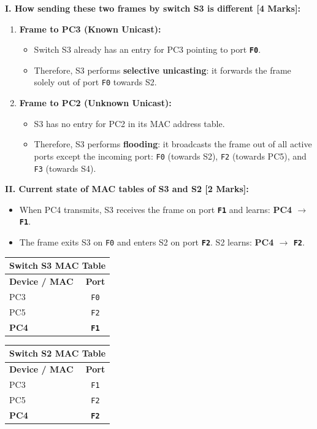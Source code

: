 \documentclass[11pt,a4paper]{article}
\begin{document}
\textbf{I. How sending these two frames by switch S3 is different [4 Marks]:}
\begin{enumerate}
    \item \textbf{Frame to PC3 (Known Unicast):}
    \begin{itemize}
        \item Switch S3 already has an entry for PC3 pointing to port \textbf{\texttt{F0}}.
        \item Therefore, S3 performs \textbf{selective unicasting}: it forwards the frame solely out of port \texttt{F0} towards S2.
    \end{itemize}
    \item \textbf{Frame to PC2 (Unknown Unicast):}
    \begin{itemize}
        \item S3 has no entry for PC2 in its MAC address table.
        \item Therefore, S3 performs \textbf{flooding}: it broadcasts the frame out of all active ports except the incoming port: \texttt{F0} (towards S2), \texttt{F2} (towards PC5), and \texttt{F3} (towards S4).
    \end{itemize}
\end{enumerate}

\vspace{0.2cm}
\textbf{II. Current state of MAC tables of S3 and S2 [2 Marks]:}
\begin{itemize}
    \item When PC4 transmits, S3 receives the frame on port \textbf{\texttt{F1}} and learns: \textbf{PC4 $\to$ \texttt{F1}}.
    \item The frame exits S3 on \texttt{F0} and enters S2 on port \textbf{\texttt{F2}}. S2 learns: \textbf{PC4 $\to$ \texttt{F2}}.
\end{itemize}

\begin{center}
\begin{tabular}{|l|c|}
\multicolumn{2}{c}{\textbf{Switch S3 MAC Table}} \\
\hline
\textbf{Device / MAC} & \textbf{Port} \\
\hline
PC3 & \texttt{F0} \\
PC5 & \texttt{F2} \\
\textbf{PC4} & \textbf{\texttt{F1}} \\
\hline
\end{tabular}
\qquad
\begin{tabular}{|l|c|}
\multicolumn{2}{c}{\textbf{Switch S2 MAC Table}} \\
\hline
\textbf{Device / MAC} & \textbf{Port} \\
\hline
PC3 & \texttt{F1} \\
PC5 & \texttt{F2} \\
\textbf{PC4} & \textbf{\texttt{F2}} \\
\hline
\end{tabular}
\end{center}
\end{document}
